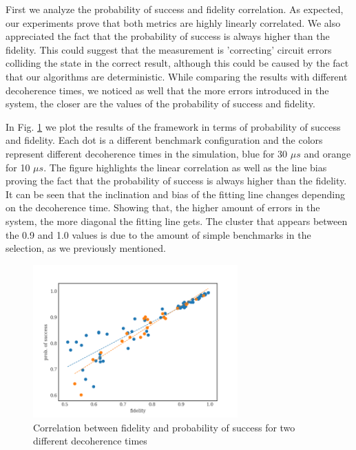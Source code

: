 First we analyze the probability of success and fidelity correlation.
As expected, our experiments prove that both metrics are highly linearly correlated.
We also appreciated the fact that the probability of success is always higher than the fidelity.
This could suggest that the measurement is 'correcting' circuit errors colliding the state in the correct result, although this could be caused by the fact that our algorithms are deterministic.
While comparing the results with different decoherence times, we noticed as well that the more errors introduced in the system, the closer are the values of the probability of success and fidelity.

In Fig. \ref{fig:f_ps_correlation_with_meas_error} we plot the results of the framework in terms of probability of success and fidelity. 
Each dot is a different benchmark configuration and the colors represent different decoherence times in the simulation, blue for 30 \(\mu s\) and orange for 10 \(\mu s\).
The figure highlights the linear correlation as well as the line bias proving the fact that the probability of success is always higher than the fidelity.
It can be seen that the inclination and bias of the fitting line changes depending on the decoherence time.
Showing that, the higher amount of errors in the system, the more diagonal the fitting line gets.
The cluster that appears between the 0.9 and 1.0 values is due to the amount of simple benchmarks in the selection, as we previously mentioned.

\begin{figure}[htbp]
\centering
\includegraphics[width=0.7\textwidth]{figures/f_ps_correlation_with_meas_error.png}
\caption{\label{fig:f_ps_correlation_with_meas_error}
Correlation between fidelity and probability of success for two different decoherence times}
\end{figure}



